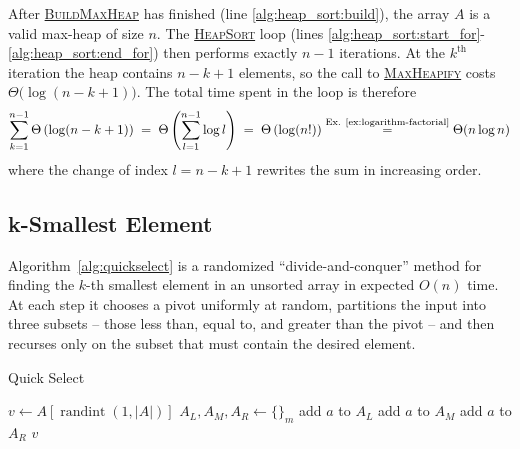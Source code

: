 After \textsc{\hyperref[alg:build_heap]{BuildMaxHeap}} has finished (line \ref{alg:heap_sort:build}), the array $A$ is a valid max-heap of size $n$.  
The \textsc{\hyperref[alg:heap_sort]{HeapSort}} loop (lines \ref{alg:heap_sort:start_for}-\ref{alg:heap_sort:end_for}) then performs exactly $n-1$ iterations.
At the $k^{\text{th}}$ iteration the heap contains $n-k+1$ elements, so the call to \textsc{\hyperref[alg:heapify]{MaxHeapify}} costs $\Theta\!\bigl(\log(n-k+1)\bigr)$.
The total time spent in the loop is therefore
\[
  \sum_{k=1}^{n-1} \Theta \left(\log(n-k+1)\right)
  \;=\;
  \Theta \left(\sum_{l=1}^{n-1}\log l \right)
  \;=\;
  \Theta \left(\log(n!)\right)
  \stackrel{\text{Ex. \ref{ex:logarithm-factorial}}}{=}
\Theta(n\log n)
\]
where the change of index $l=n-k+1$ rewrites the sum in increasing order.



\subsection{k-Smallest Element}
\label{subsec:quickselect}
Algorithm~\ref{alg:quickselect} is a randomized “divide-and-conquer” method for finding the $k$-th smallest element in an unsorted array in expected $O(n)$ time.  
At each step it chooses a pivot uniformly at random, partitions the input into three subsets -- those less than, equal to, and greater than the pivot -- and then recurses only on the subset that must contain the desired element.
\begin{algorithm}[htb]
\caption{Quick Select}
\label{alg:quickselect}
\begin{algorithmic}[1]
 
\State $v \gets A[\operatorname{randint}(1,|A|)]$ 
\State $A_L, A_M, A_R \gets \{\}_m$ 
        \State add $a$ to $A_L$
        \State add $a$ to $A_M$
    \Else
        \State add $a$ to $A_R$
    \EndIf
\EndFor
\State \Return {}
\State \Return $v$
\Else
\State \Return {}
\EndIf
\EndFunction
\end{algorithmic}
\end{algorithm}

